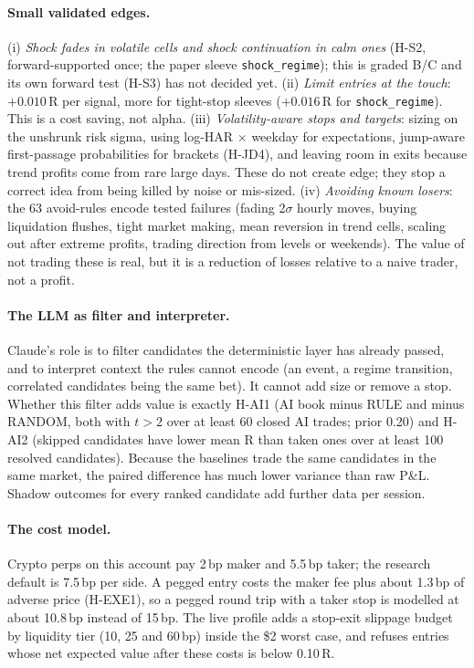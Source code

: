 \documentclass[10pt,a4paper]{article}
\newcommand{\hyp}[1]{\textsf{#1}}
\begin{document}
\paragraph{Small validated edges.} (i) \emph{Shock fades in volatile cells and shock continuation in calm ones} (\hyp{H-S2}, forward-supported once; the paper sleeve \texttt{shock\_regime}); this is graded B/C and its own forward test (\hyp{H-S3}) has not decided yet. (ii) \emph{Limit entries at the touch}: $+0.010$\,R per signal, more for tight-stop sleeves ($+0.016$\,R for \texttt{shock\_regime}). This is a cost saving, not alpha. (iii) \emph{Volatility-aware stops and targets}: sizing on the unshrunk risk sigma, using log-HAR $\times$ weekday for expectations, jump-aware first-passage probabilities for brackets (\hyp{H-JD4}), and leaving room in exits because trend profits come from rare large days. These do not create edge; they stop a correct idea from being killed by noise or mis-sized. (iv) \emph{Avoiding known losers}: the 63 avoid-rules encode tested failures (fading 2$\sigma$ hourly moves, buying liquidation flushes, tight market making, mean reversion in trend cells, scaling out after extreme profits, trading direction from levels or weekends). The value of not trading these is real, but it is a reduction of losses relative to a naive trader, not a profit.

\paragraph{The LLM as filter and interpreter.} Claude's role is to filter candidates the deterministic layer has already passed, and to interpret context the rules cannot encode (an event, a regime transition, correlated candidates being the same bet). It cannot add size or remove a stop. Whether this filter adds value is exactly \hyp{H-AI1} (AI book minus RULE and minus RANDOM, both with $t>2$ over at least 60 closed AI trades; prior 0.20) and \hyp{H-AI2} (skipped candidates have lower mean R than taken ones over at least 100 resolved candidates). Because the baselines trade the same candidates in the same market, the paired difference has much lower variance than raw P\&L. Shadow outcomes for every ranked candidate add further data per session.

\paragraph{The cost model.} Crypto perps on this account pay 2\,bp maker and 5.5\,bp taker; the research default is 7.5\,bp per side. A pegged entry costs the maker fee plus about 1.3\,bp of adverse price (\hyp{H-EXE1}), so a pegged round trip with a taker stop is modelled at about 10.8\,bp instead of 15\,bp. The live profile adds a stop-exit slippage budget by liquidity tier (10, 25 and 60\,bp) inside the \$2 worst case, and refuses entries whose net expected value after these costs is below 0.10\,R.
\end{document}
